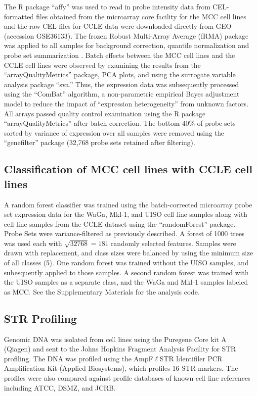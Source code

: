 \documentclass[10pt]{article}
\begin{document}
The R package ``affy'' \citep{Gautier2004Affyanalysis} was used to read in probe intensity data from CEL-formatted files obtained from the microarray core facility for the MCC cell lines and the raw CEL files for CCLE data were downloaded directly from GEO (accession GSE36133).
The frozen Robust Multi-Array Average (fRMA) package was applied to all samples for background correction, quantile normalization and probe set summarization \citep{McCall2010Frozen}.
Batch effects between the MCC cell lines and the CCLE cell lines were observed by examining the results from the ``arrayQualityMetrics'' package, PCA plots, and using the surrogate variable analysis package ``sva.''
Thus, the expression data was subsequently processed using the ``ComBat'' algorithm, a non-parametric empirical Bayes adjustment model \citep{Johnson2007Adjusting} to reduce the impact of ``expression heterogeneity'' from unknown factors.
All arrays passed quality control examination using the R package ``arrayQualityMetrics'' after batch correction.
The bottom 40\% of probe sets sorted by variance of expression over all samples were removed using the ``genefilter'' package (32,768 probe sets retained after filtering).

\subsection*{Classification of MCC cell lines with CCLE cell lines}

A random forest classifier was trained using the batch-corrected microarray probe set expression data for the WaGa, Mkl-1, and UISO cell line samples along with cell line samples from the CCLE dataset using the ``randomForest'' package.
Probe Sets were variance-filtered as previously described.
A forest of 1000 trees was used each with $\sqrt{32768}=181$ randomly selected features.
Samples were drawn with replacement, and class sizes were balanced by using the minimum size of all classes (5).
One random forest was trained without the UISO samples, and subesquently applied to those samples.
A second random forest was trained with the UISO samples as a separate class, and the WaGa and Mkl-1 samples labeled as MCC.
See the Supplementary Materials for the analysis code.

\subsection*{STR Profiling}

Genomic DNA was isolated from cell lines using the Puregene Core kit A (Qiagen) and sent to the Johns Hopkins Fragment Analysis Facility for STR profiling.
The DNA was profiled using the AmpF$\ell$STR Identifiler PCR Amplification Kit (Applied Biosystems), which profiles 16 STR markers.
The profiles were also compared against profile databases of known cell line references including ATCC, DSMZ, and JCRB.
\end{document}
